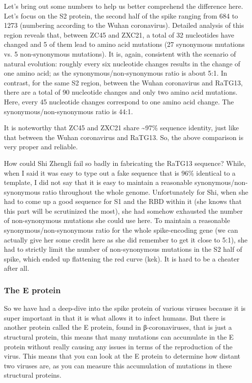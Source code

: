 \documentclass[11pt]{article}
\begin{document}
Let’s bring out some numbers to help us better comprehend the difference here. Let’s focus on the S2 protein, the second half of the spike ranging from 684 to 1273 (numbering according to the Wuhan coronavirus). Detailed analysis of this region reveals that, between ZC45 and ZXC21, a total of 32 nucleotides have changed and 5 of them lead to amino acid mutations (27 synonymous mutations vs. 5 non-synonymous mutations). It is, again, consistent with the scenario of natural evolution: roughly every six nucleotide changes results in the change of one amino acid; as the synonymous/non-synonymous ratio is about 5:1. In contrast, for the same S2 region, between the Wuhan coronavirus and RaTG13, there are a total of 90 nucleotide changes and only two amino acid mutations. Here, every 45 nucleotide changes correspond to one amino acid change. The synonymous/non-synonymous ratio is 44:1.

It is noteworthy that ZC45 and ZXC21 share \textasciitilde{}97\% sequence identity, just like that between the Wuhan coronavirus and RaTG13. So, the above comparison is very proper and reliable.

How could Shi Zhengli fail so badly in fabricating the RaTG13 sequence? While, when I said it was easy to type out a fake sequence that is 96\% identical to a template, I did not say that it is easy to maintain a reasonable synonymous/non-synonymous ratio throughout the whole genome. Unfortunately for Shi, when she had to come up a good sequence for S1 and the RBD within it (she knows that this part will be scrutinized the most), she had somehow exhausted the number of non-synonymous mutations she could use here. To maintain a reasonable synonymous/non-synonymous ratio for the whole spike-encoding gene (we can actually give her some credit here as she did remember to get it close to 5:1), she had to strictly limit the number of non-synonymous mutations in the S2 half of spike, which ended up flattening the red curve (kek). It is hard to be a cheater after all.
\subsubsection{The E protein}
\label{sec:org51fe25e}
So we have had a deep-dive into the spike protein of various viruses because it is super important in that it is what allows it to infect humans. But there is another protein called the E protein, found in β-coronaviruses, that is just a structural protein, this means that many mutations can accumulate in the E protein without really causing any issues in terms of the reproduction of the virus. This means that you can look at the E protein to determine how distant two viruses are, as you can measure this accumulation of mutations in these structural proteins.
\end{document}
